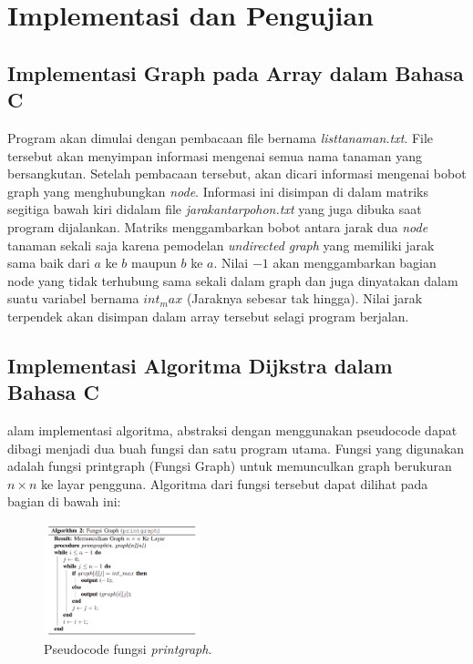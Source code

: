 \documentclass[conference]{IEEEtran}
\begin{document}
\section{Implementasi dan Pengujian}

\subsection{Implementasi Graph pada Array dalam Bahasa C}

    Program akan dimulai dengan pembacaan file bernama
    \textit{listtanaman.txt}. File tersebut akan menyimpan informasi mengenai semua nama tanaman yang bersangkutan. Setelah pembacaan tersebut, akan dicari informasi mengenai bobot graph
    yang menghubungkan \textit{node}. Informasi ini disimpan di dalam
    matriks segitiga bawah kiri didalam file \textit{jarakantarpohon.txt}
    yang juga dibuka saat program dijalankan. Matriks menggambarkan bobot antara jarak dua \textit{node} tanaman sekali saja karena
    pemodelan \textit{undirected graph} yang memiliki jarak sama baik
    dari $a$ ke $b$ maupun $b$ ke $a$. Nilai $-1$ akan menggambarkan
    bagian node yang tidak terhubung sama sekali dalam graph 
    dan juga dinyatakan dalam suatu variabel bernama $int_max$
    (Jaraknya sebesar tak hingga). Nilai jarak terpendek akan
    disimpan dalam array tersebut selagi program berjalan.

\subsection{Implementasi Algoritma Dijkstra dalam Bahasa C}

    alam implementasi algoritma, abstraksi dengan menggunakan pseudocode dapat dibagi menjadi dua buah fungsi dan
    satu program utama. Fungsi yang digunakan adalah fungsi
    printgraph (Fungsi Graph) untuk memunculkan graph berukuran $n \times n$ ke layar pengguna. Algoritma dari fungsi tersebut
    dapat dilihat pada bagian di bawah ini:

    \begin{figure}[H]
        \centerline{\includegraphics[width=0.4\textwidth]{./sources/printgraph.png}}
        \caption{Pseudocode fungsi \textit{printgraph}.}
        \label{fig3}
    \end{figure}
\end{document}

